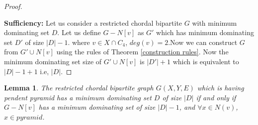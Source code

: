 \documentclass[11pt]{article}
\newtheorem{lemma}{Lemma}
\begin{document}
\begin{proof}
\begin{center}
\end{center}
\textbf{Sufficiency:} Let us consider a restricted chordal bipartite $G$ with minimum dominating set $D$. Let us define $G-N[v]$ as $G'$ which has minimum dominating set $D'$ of size $|D|-1$.  where $v \in X \cap C_4$, $deg(v) = 2$.Now we can construct $G$ from $G'\cup N[v]$ using the rules of Theorem \ref{construction rules}. Now the minimum dominating set size of $G' \cup N[v]$ is $|D'|+1$ which is equivalent to $|D| - 1 + 1$ i.e, $|D|$.
\end{proof}
%
%
\begin{lemma}
The restricted chordal bipartite graph $G(X,Y,E)$ which is having pendent pyramid has a minimum dominating set $D$ of size $|D|$ if and only if $ G-N[v]$ has a minimum dominating set of size $|D|-1$, and $\forall x \in N(v)$, $x \in pyramid$.
\end{lemma}
\end{document}
